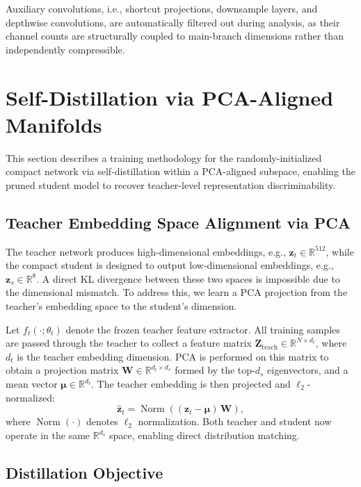 \documentclass[10pt, conference]{IEEEtran}
\begin{document}
Auxiliary convolutions, i.e., shortcut projections, downsample layers, and depthwise convolutions, are automatically filtered out during analysis, as their channel counts are structurally coupled to main-branch dimensions rather than independently compressible.


\section{Self-Distillation via PCA-Aligned Manifolds}

This section describes a training methodology for the randomly-initialized compact network via self-distillation within a PCA-aligned subspace, enabling the pruned student model to recover teacher-level representation discriminability.

\subsection{Teacher Embedding Space Alignment via PCA}

The teacher network produces high-dimensional embeddings, e.g., $\mathbf{z}_t \in \mathbb{R}^{512}$, while the compact student is designed to output low-dimensional embeddings, e.g., $\mathbf{z}_s \in \mathbb{R}^{8}$.
A direct KL divergence between these two spaces is impossible due to the dimensional mismatch.
To address this, we learn a PCA projection from the teacher's embedding space to the student's dimension.

Let $f_t(\cdot;\theta_t)$ denote the frozen teacher feature extractor.
All training samples are passed through the teacher to collect a feature matrix $\mathbf{Z}_{\text{teach}} \in \mathbb{R}^{N \times d_t}$, where $d_t$ is the teacher embedding dimension.
PCA is performed on this matrix to obtain a projection matrix $\mathbf{W} \in \mathbb{R}^{d_t \times d_s}$ formed by the top-$d_s$ eigenvectors, and a mean vector $\boldsymbol{\mu} \in \mathbb{R}^{d_t}$.
The teacher embedding is then projected and $\ell_2$-normalized:
\begin{equation}
\label{eq:proj}
\hat{\mathbf{z}}_t =
\operatorname{Norm}\!\left(
(\mathbf{z}_t - \boldsymbol{\mu}) \, \mathbf{W}
\right),
\end{equation}
where $\operatorname{Norm}(\cdot)$ denotes $\ell_2$ normalization.
Both teacher and student now operate in the same $\mathbb{R}^{d_s}$ space, enabling direct distribution matching.

\subsection{Distillation Objective}
\end{document}
